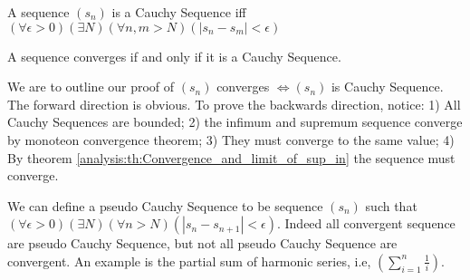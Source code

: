 \documentclass[../note.tex]{subfiles}
\begin{document}
\begin{definition}\cite{Ross}
	A sequence $(s_n)$ is a Cauchy Sequence iff $(\forall \epsilon > 0)(\exists N)(\forall n,m>N)(|s_n-s_m|<\epsilon)$
\end{definition}
\begin{theorem}
A sequence converges if and only if it is a Cauchy Sequence. 
\end{theorem}
\begin{remark}
We are to outline our proof of $(s_n)$ converges $\iff (s_n)$ is Cauchy Sequence. \\
The forward direction is obvious. To prove the backwards direction, notice: 1) All Cauchy Sequences are bounded; 2) the infimum and supremum sequence converge by monoteon convergence theorem; 3) They must converge to the same value;
4) By theorem \ref{analysis:th:Convergence_and_limit_of_sup_in} the sequence must converge. 
\end{remark}
\begin{remark}
	We can define a pseudo Cauchy Sequence to be sequence $(s_n)$ such that $(\forall \epsilon > 0)(\exists N)(\forall n>N)(|s_n-s_{n+1}|<\epsilon)$.
	Indeed all convergent sequence are pseudo Cauchy Sequence, but not all pseudo Cauchy Sequence are convergent. An example is the partial sum of harmonic series, i.e, $(\sum^{n}_{i=1}\frac{1}{i})$.
\end{remark}



\end{document}

